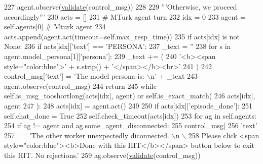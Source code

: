 \begin{DoxyCode}
227                 agent.observe(\hyperlink{namespaceparlai_1_1core_1_1worlds_afc3fad603b7bce41dbdc9cdc04a9c794}{validate}(control\_msg))
228 
229         \textcolor{stringliteral}{'''Otherwise, we proceed accordingly'''}
230         acts = []
231         \textcolor{comment}{# MTurk agent turn}
232         idx = 0
233         agent = self.agents[0]  \textcolor{comment}{# Mturk agent}
234         acts.append(agent.act(timeout=self.max\_resp\_time))
235         \textcolor{keywordflow}{if} acts[idx] \textcolor{keywordflow}{is} \textcolor{keywordflow}{not} \textcolor{keywordtype}{None}:
236             \textcolor{keywordflow}{if} acts[idx][\textcolor{stringliteral}{'text'}] == \textcolor{stringliteral}{'PERSONA'}:
237                 \_text = \textcolor{stringliteral}{''}
238                 \textcolor{keywordflow}{for} s \textcolor{keywordflow}{in} agent.model\_persona[1][\textcolor{stringliteral}{'persona'}]:
239                     \_text += (
240                         \textcolor{stringliteral}{'<b><span style="color:blue">'} + s.strip() + \textcolor{stringliteral}{'</span></b><br>'}
241                     )
242                 control\_msg[\textcolor{stringliteral}{'text'}] = \textcolor{stringliteral}{'The model persona is: \(\backslash\)n'} + \_text
243                 agent.observe(control\_msg)
244                 \textcolor{keywordflow}{return}
245             \textcolor{keywordflow}{while} self.is\_msg\_tooshortlong(acts[idx], agent) \textcolor{keywordflow}{or} self.is\_exact\_match(
246                 acts[idx], agent
247             ):
248                 acts[idx] = agent.act()
249 
250             \textcolor{keywordflow}{if} acts[idx][\textcolor{stringliteral}{'episode\_done'}]:
251                 self.chat\_done = \textcolor{keyword}{True}
252                 self.check\_timeout(acts[idx])
253                 \textcolor{keywordflow}{for} ag \textcolor{keywordflow}{in} self.agents:
254                     \textcolor{keywordflow}{if} ag != agent \textcolor{keywordflow}{and} ag.some\_agent\_disconnected:
255                         control\_msg[
256                             \textcolor{stringliteral}{'text'}
257                         ] = \textcolor{stringliteral}{'The other worker unexpectedly diconnected. \(\backslash\)n \(\backslash\)}
258 \textcolor{stringliteral}{                            Please click <span style="color:blue"><b>Done with this HIT</b></span> button
       below to exit this HIT. No rejections.'}
259                         ag.observe(\hyperlink{namespaceparlai_1_1core_1_1worlds_afc3fad603b7bce41dbdc9cdc04a9c794}{validate}(control\_msg))

\end{DoxyCode}
